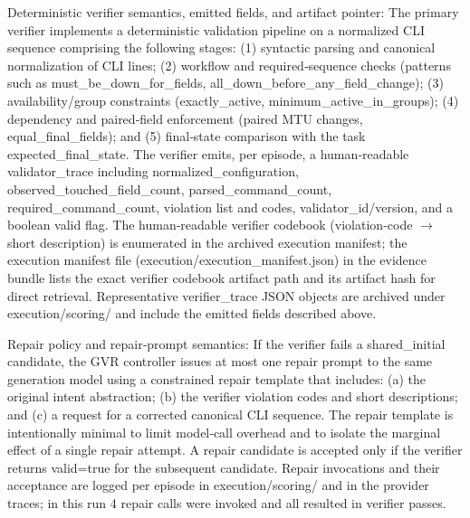 \documentclass[conference]{IEEEtran}
\begin{document}
Deterministic verifier semantics, emitted fields, and artifact pointer: The primary verifier implements a deterministic validation pipeline on a normalized CLI sequence comprising the following stages: (1) syntactic parsing and canonical normalization of CLI lines; (2) workflow and required‑sequence checks (patterns such as must\_be\_down\_for\_fields, all\_down\_before\_any\_field\_change); (3) availability/group constraints (exactly\_active, minimum\_active\_in\_groups); (4) dependency and paired‑field enforcement (paired MTU changes, equal\_final\_fields); and (5) final‑state comparison with the task expected\_final\_state. The verifier emits, per episode, a human‑readable validator\_trace including normalized\_configuration, observed\_touched\_field\_count, parsed\_command\_count, required\_command\_count, violation list and codes, validator\_id/version, and a boolean valid flag. The human‑readable verifier codebook (violation‑code \ensuremath{\rightarrow} short description) is enumerated in the archived execution manifest; the execution manifest file (execution/execution\_manifest.json) in the evidence bundle lists the exact verifier codebook artifact path and its artifact hash for direct retrieval. Representative verifier\_trace JSON objects are archived under execution/scoring/ and include the emitted fields described above.

Repair policy and repair‑prompt semantics: If the verifier fails a shared\_initial candidate, the GVR controller issues at most one repair prompt to the same generation model using a constrained repair template that includes: (a) the original intent abstraction; (b) the verifier violation codes and short descriptions; and (c) a request for a corrected canonical CLI sequence. The repair template is intentionally minimal to limit model‑call overhead and to isolate the marginal effect of a single repair attempt. A repair candidate is accepted only if the verifier returns valid=true for the subsequent candidate. Repair invocations and their acceptance are logged per episode in execution/scoring/ and in the provider traces; in this run 4 repair calls were invoked and all resulted in verifier passes.
\end{document}
